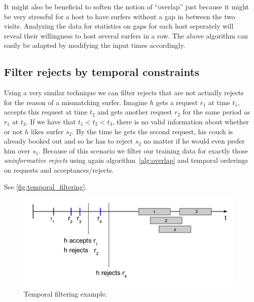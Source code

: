 It might also be beneficial to soften the notion of ``overlap'' just because it might be very stressful for a host to have surfers without a gap in between the two visits. Analyzing the data for statistics on gaps for each host seperately will reveal their willingness to host several surfers in a row. The above algorithm can easily be adapted by modifying the input times accordingly.

\subsection{Filter rejects by temporal constraints}
Using a very similar technique we can filter rejects that are not actually rejects for the reason of a mismatching surfer. Imagine $h$ gets a request $r_1$ at time $t_1$, accepts this request at time $t_2$ and gets another request $r_2$ for the same period as $r_1$ at $t_3$. If we have that $t_1 < t_2 < t_3$, there is no valid information about whether or not $h$ likes surfer $s_2$. By the time he gets the second request, his couch is already booked out and so he has to reject $s_2$ no matter if he would even prefer him over $s_1$. Because of this scenario we filter our training data for exactly those \textit{uninformative rejects} using again algorithm~\ref{alg:overlap} and temporal orderings on requests and acceptances/rejects.


See \autoref{fig:temporal_filtering}.

\begin{figure}[ht]
\centering
\includegraphics[width=1\linewidth]{figures/temporal_filtering.png}
\caption{Temporal filtering example. }
\label{fig:temporal_filtering}
\end{figure}


